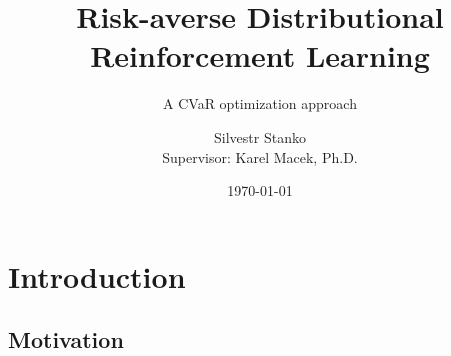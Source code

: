 \documentclass{beamer}
\title[Risk-averse Distributional RL]{Risk-averse Distributional Reinforcement Learning}
\subtitle{A CVaR optimization approach}
\author[Silvestr Stanko]{Silvestr Stanko\inst{1}\\
		Supervisor: Karel Macek, Ph.D.\inst{2}}
\institute[] %
{
  \inst{1}%
  Department of Computer Science\\
  Czech Technical University
  \and
  \inst{2}%
  DHL Information Services
  }
\date{\today}
\begin{document}
\begin{frame}
  \titlepage
\end{frame}




\section{Introduction}

\subsection{Motivation}

%
%
%

\end{document}
